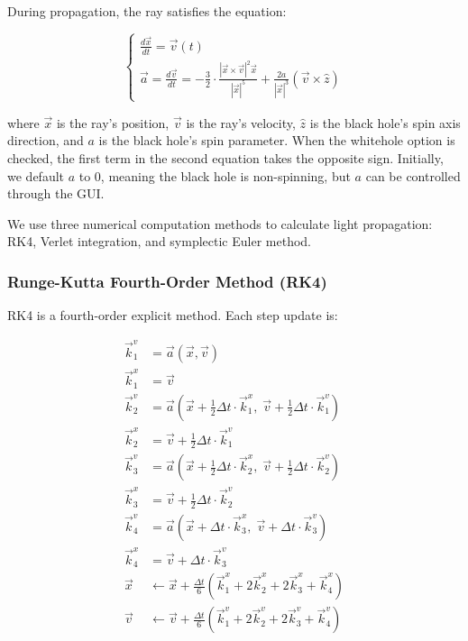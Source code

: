 \documentclass[11pt,a4paper]{article}
\begin{document}
During propagation, the ray satisfies the equation:

\begin{equation}
\boxed{
\begin{cases}
\displaystyle \frac{d\vec{x}}{dt} = \vec{v}(t) \\[10pt]
\displaystyle \vec{a}=\frac{d\vec{v}}{dt} = -\frac{3}{2} \cdot \frac{|\vec{x}\times\vec{v}|^2 \vec{x}}{|\vec{x}|^5} + \frac{2a}{|\vec{x}|^3} \left( \vec{v} \times \hat{z} \right)
\end{cases}
}
\end{equation}

where $\vec{x}$ is the ray's position, $\vec{v}$ is the ray's velocity, $\hat{z}$ is the black hole's spin axis direction, and $a$ is the black hole's spin parameter. When the whitehole option is checked, the first term in the second equation takes the opposite sign. Initially, we default $a$ to 0, meaning the black hole is non-spinning, but $a$ can be controlled through the GUI.

We use three numerical computation methods to calculate light propagation: RK4, Verlet integration, and symplectic Euler method.

\subsubsection{Runge-Kutta Fourth-Order Method (RK4)}

RK4 is a fourth-order explicit method. Each step update is:

\begin{align}
\vec{k}_1^v &= \vec{a}(\vec{x}, \vec{v}) \\
\vec{k}_1^x &= \vec{v} \\
\vec{k}_2^v &= \vec{a}(\vec{x} + \tfrac{1}{2}\Delta t \cdot \vec{k}_1^x,\; \vec{v} + \tfrac{1}{2}\Delta t \cdot \vec{k}_1^v) \\
\vec{k}_2^x &= \vec{v} + \tfrac{1}{2}\Delta t \cdot \vec{k}_1^v \\
\vec{k}_3^v &= \vec{a}(\vec{x} + \tfrac{1}{2}\Delta t \cdot \vec{k}_2^x,\; \vec{v} + \tfrac{1}{2}\Delta t \cdot \vec{k}_2^v) \\
\vec{k}_3^x &= \vec{v} + \tfrac{1}{2}\Delta t \cdot \vec{k}_2^v \\
\vec{k}_4^v &= \vec{a}(\vec{x} + \Delta t \cdot \vec{k}_3^x,\; \vec{v} + \Delta t \cdot \vec{k}_3^v) \\
\vec{k}_4^x &= \vec{v} + \Delta t \cdot \vec{k}_3^v \\
\vec{x} &\leftarrow \vec{x} + \frac{\Delta t}{6}(\vec{k}_1^x + 2\vec{k}_2^x + 2\vec{k}_3^x + \vec{k}_4^x) \\
\vec{v} &\leftarrow \vec{v} + \frac{\Delta t}{6}(\vec{k}_1^v + 2\vec{k}_2^v + 2\vec{k}_3^v + \vec{k}_4^v)
\end{align}
\end{document}
